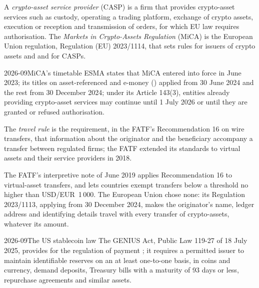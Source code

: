 \begin{definition}\label{def:m3:the-crypto-trading-business:mica}
A \emph{crypto-asset service provider} (CASP) is a firm that provides crypto-asset services such as custody, operating a
trading platform, exchange of crypto assets, execution or reception and transmission of orders, for which EU law requires authorisation. The \emph{Markets in
Crypto-Assets Regulation} (MiCA) is the European Union regulation, Regulation (EU) 2023/1114, that sets rules for
issuers of crypto assets and  and for CASPs.
\end{definition}

\begin{dated}{2026-09}{MiCA's timetable}\label{dat:m3:the-crypto-trading-business:mica}
ESMA states that MiCA entered into force in June 2023; its titles on asset-referenced  and e-money  () applied from 30 June 2024 and the
rest from 30 December 2024; under its Article 143(3), entities already providing crypto-asset services may continue until 1 July 2026 or until they are granted or
refused authorisation.
\end{dated}

\begin{definition}\label{def:m3:the-crypto-trading-business:travel}
The \emph{travel rule} is the requirement, in the FATF's Recommendation 16 on wire transfers, that information about the originator and the
beneficiary accompany a transfer between regulated firms; the FATF extended its standards to virtual assets and their service providers in 2018.
\end{definition}

The FATF's interpretive note of June 2019 applies Recommendation 16 to virtual-asset transfers, and lets countries exempt transfers below a threshold
no higher than USD/EUR~1\,000. The European Union chose none: its Regulation 2023/1113, applying from 30 December 2024, makes the originator's
name, ledger address and identifying details travel with every transfer of crypto-assets, whatever its amount.

\begin{dated}{2026-09}{The US stablecoin law}\label{dat:m3:the-crypto-trading-business:genius}
The GENIUS Act, Public Law 119-27 of 18 July 2025, provides for the regulation of payment ; it requires a permitted issuer to maintain identifiable
reserves on an at least one-to-one basis, in coins and currency, demand deposits, Treasury bills with a maturity of 93 days or less, repurchase agreements and
similar assets.
\end{dated}

